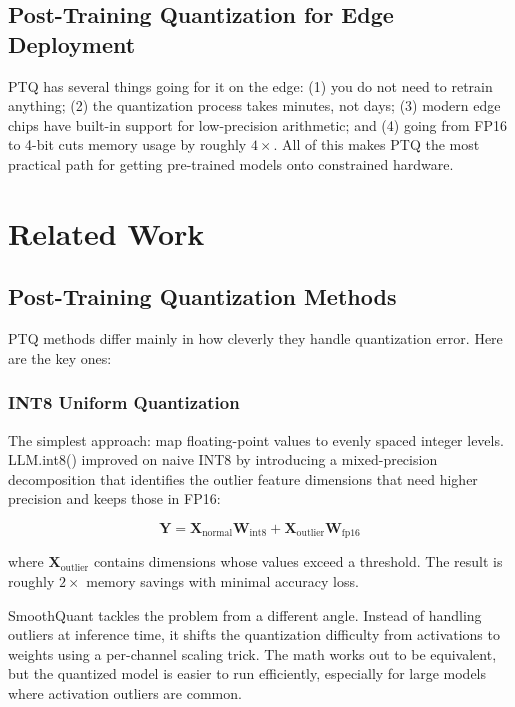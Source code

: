 \documentclass[11pt,a4paper]{article}
\begin{document}
\subsection{Post-Training Quantization for Edge Deployment}

PTQ has several things going for it on the edge: (1) you do not need to retrain anything; (2) the quantization process takes minutes, not days; (3) modern edge chips have built-in support for low-precision arithmetic; and (4) going from FP16 to 4-bit cuts memory usage by roughly $4\times$. All of this makes PTQ the most practical path for getting pre-trained models onto constrained hardware.

\section{Related Work}

\subsection{Post-Training Quantization Methods}

PTQ methods differ mainly in how cleverly they handle quantization error. Here are the key ones:

\subsubsection{INT8 Uniform Quantization}

The simplest approach: map floating-point values to evenly spaced integer levels. LLM.int8() \cite{dettmers2022llm} improved on naive INT8 by introducing a mixed-precision decomposition that identifies the outlier feature dimensions that need higher precision and keeps those in FP16:

\begin{equation}
\mathbf{Y} = \mathbf{X}_{\text{normal}} \mathbf{W}_{\text{int8}} + \mathbf{X}_{\text{outlier}} \mathbf{W}_{\text{fp16}}
\end{equation}

where $\mathbf{X}_{\text{outlier}}$ contains dimensions whose values exceed a threshold. The result is roughly $2\times$ memory savings with minimal accuracy loss.

SmoothQuant \cite{xiao2023smoothquant} tackles the problem from a different angle. Instead of handling outliers at inference time, it shifts the quantization difficulty from activations to weights using a per-channel scaling trick. The math works out to be equivalent, but the quantized model is easier to run efficiently, especially for large models where activation outliers are common.
\end{document}
